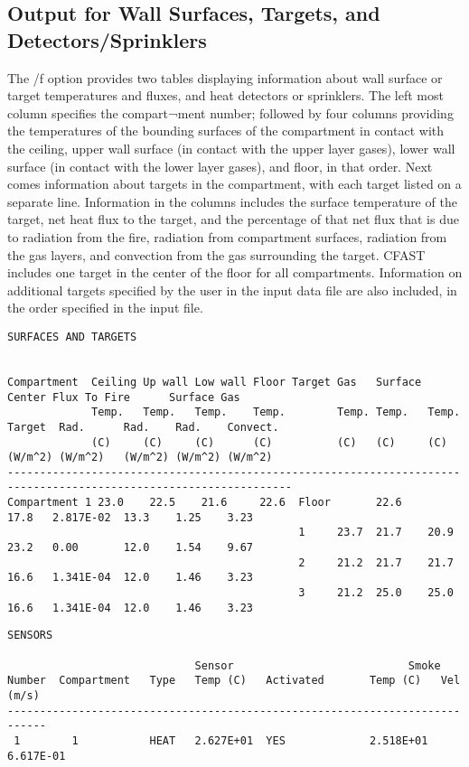 \subsection{Output for Wall Surfaces, Targets, and Detectors/Sprinklers}

The /f option provides two tables displaying information about wall surface or target temperatures and fluxes, and heat detectors or sprinklers. The left most column specifies the compart¬ment number; followed by four columns providing the temperatures of the bounding surfaces of the compartment in contact with the ceiling, upper wall surface (in contact with the upper layer gases), lower wall surface (in contact with the lower layer gases), and floor, in that order. Next comes information about targets in the compartment, with each target listed on a separate line.  Information in the columns includes the surface temperature of the target, net heat flux to the target, and the percentage of that net flux that is due to radiation from the fire, radiation from compartment surfaces, radiation from the gas layers, and convection from the gas surrounding the target.  CFAST includes one target in the center of the floor for all compartments. Information on additional targets specified by the user in the input data file are also included, in the order specified in the input file.

\begin{lstlisting}[basicstyle=\tiny]
SURFACES AND TARGETS


Compartment  Ceiling Up wall Low wall Floor Target Gas   Surface Center Flux To Fire      Surface Gas
             Temp.   Temp.   Temp.    Temp.        Temp. Temp.   Temp.  Target  Rad.      Rad.    Rad.    Convect.
             (C)     (C)     (C)      (C)          (C)   (C)     (C)    (W/m^2) (W/m^2)   (W/m^2) (W/m^2) (W/m^2)
------------------------------------------------------------------------------------------------------------------
Compartment 1 23.0    22.5    21.6     22.6  Floor       22.6            17.8   2.817E-02  13.3    1.25    3.23
                                             1     23.7  21.7    20.9    23.2   0.00       12.0    1.54    9.67
                                             2     21.2  21.7    21.7    16.6   1.341E-04  12.0    1.46    3.23
                                             3     21.2  25.0    25.0    16.6   1.341E-04  12.0    1.46    3.23
\end{lstlisting}
\newpage
\begin{lstlisting}[basicstyle=\tiny]
SENSORS

                             Sensor                           Smoke
Number  Compartment   Type   Temp (C)   Activated       Temp (C)   Vel (m/s)
----------------------------------------------------------------------------
 1        1           HEAT   2.627E+01  YES             2.518E+01  6.617E-01
 \end{lstlisting}

